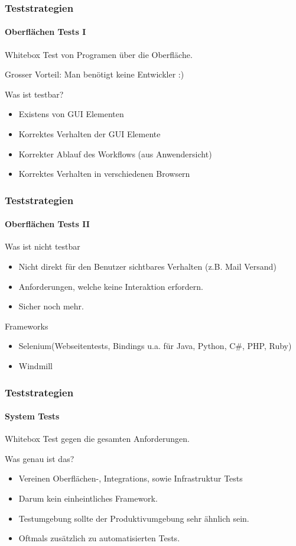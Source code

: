 \begin{frame}
  \frametitle{Teststrategien}
  \framesubtitle{Oberflächen Tests I}
  Whitebox Test von Programen über die Oberfläche.\\
  \begin{block}{Grosser Vorteil:}
    \pause
    Man benötigt keine Entwickler :)
  \end{block}
  \pause
  \begin{block}{Was ist testbar?}
    \pause
    \begin{itemize}
    \item  Existens von GUI Elementen
      \pause
    \item Korrektes Verhalten der GUI Elemente
      \pause
    \item Korrekter Ablauf des Workflows (aus Anwendersicht)
      \pause
    \item Korrektes Verhalten in verschiedenen Browsern
    \end{itemize}
  \end{block}
\end{frame}

\begin{frame}
  \frametitle{Teststrategien}
  \framesubtitle{Oberflächen Tests II}
  \begin{block}{Was ist nicht testbar}
    \pause
    \begin{itemize}
    \item Nicht direkt für den Benutzer sichtbares Verhalten (z.B. Mail Versand)
      \pause
    \item Anforderungen, welche keine Interaktion erfordern.
      \pause
    \item Sicher noch mehr.
    \end{itemize}
  \end{block}
  \pause
  \begin{block}{Frameworks}
    \begin{itemize}
      \item Selenium(Webseitentests, Bindings u.a. für Java, Python, C\#, PHP, Ruby)
      \item Windmill
    \end{itemize}
  \end{block}
\end{frame}

\begin{frame}
  \frametitle{Teststrategien}
  \framesubtitle{System Tests}
  Whitebox Test gegen die gesamten Anforderungen.
  \pause
  \begin{block}{Was genau ist das?}
    \begin{itemize}
    \item  Vereinen Oberflächen-, Integrations, sowie Infrastruktur Tests
      \pause
    \item Darum kein einheintliches Framework.
      \pause
    \item Testumgebung sollte der Produktivumgebung sehr ähnlich sein.
      \pause
    \item Oftmals zusätzlich zu automatisierten Tests.
    \end{itemize}
  \end{block}
\end{frame}


